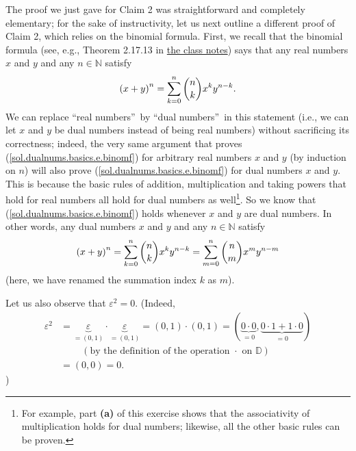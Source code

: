 \documentclass[paper=a4, fontsize=12pt]{scrartcl}%
\let\sumnonlimits\sum
\renewcommand{\sum}{\sumnonlimits\limits}
\theoremstyle{plainsl}
\theoremstyle{definition}
\theoremstyle{remark}
\begin{document}
The proof we just gave for Claim 2 was straightforward and completely
elementary; for the sake of instructivity, let us next outline a different
proof of Claim 2, which relies on the binomial formula. First, we recall that
the binomial formula (see, e.g., Theorem 2.17.13 in
\href{http://www.cip.ifi.lmu.de/~grinberg/t/19s/notes.pdf}{the class notes})
says that any real numbers $x$ and $y$ and any $n\in\mathbb{N}$ satisfy%
\begin{equation}
\left(  x+y\right)  ^{n}=\sum_{k=0}^{n}\dbinom{n}{k}x^{k}y^{n-k}.
\label{sol.dualnums.basics.e.binomf}%
\end{equation}
We can replace \textquotedblleft real numbers\textquotedblright\ by
\textquotedblleft dual numbers\textquotedblright\ in this statement (i.e., we
can let $x$ and $y$ be dual numbers instead of being real numbers) without
sacrificing its correctness; indeed, the very same argument that proves
(\ref{sol.dualnums.basics.e.binomf}) for arbitrary real numbers $x$ and $y$
(by induction on $n$) will also prove (\ref{sol.dualnums.basics.e.binomf}) for
dual numbers $x$ and $y$. This is because the basic rules of addition,
multiplication and taking powers that hold for real numbers all hold for dual
numbers as well\footnote{For example, part \textbf{(a)} of this exercise shows
that the associativity of multiplication holds for dual numbers; likewise, all
the other basic rules can be proven.}. So we know that
(\ref{sol.dualnums.basics.e.binomf}) holds whenever $x$ and $y$ are dual
numbers. In other words, any dual numbers $x$ and $y$ and any $n\in\mathbb{N}$
satisfy%
\begin{equation}
\left(  x+y\right)  ^{n}=\sum_{k=0}^{n}\dbinom{n}{k}x^{k}y^{n-k}=\sum
_{m=0}^{n}\dbinom{n}{m}x^{m}y^{n-m} \label{sol.dualnums.basics.e.binomf2}%
\end{equation}
(here, we have renamed the summation index $k$ as $m$).

Let us also observe that $\varepsilon^{2}=0$. (Indeed,
\begin{align*}
\varepsilon^{2}  &  =\underbrace{\varepsilon}_{=\left(  0,1\right)  }%
\cdot\underbrace{\varepsilon}_{=\left(  0,1\right)  }=\left(  0,1\right)
\cdot\left(  0,1\right)  =\left(  \underbrace{0\cdot0}_{=0},\underbrace{0\cdot
1+1\cdot0}_{=0}\right) \\
&  \ \ \ \ \ \ \ \ \ \ \left(  \text{by the definition of the operation }%
\cdot\text{ on }\mathbb{D}\right) \\
&  =\left(  0,0\right)  =0.
\end{align*}
)
\end{document}
